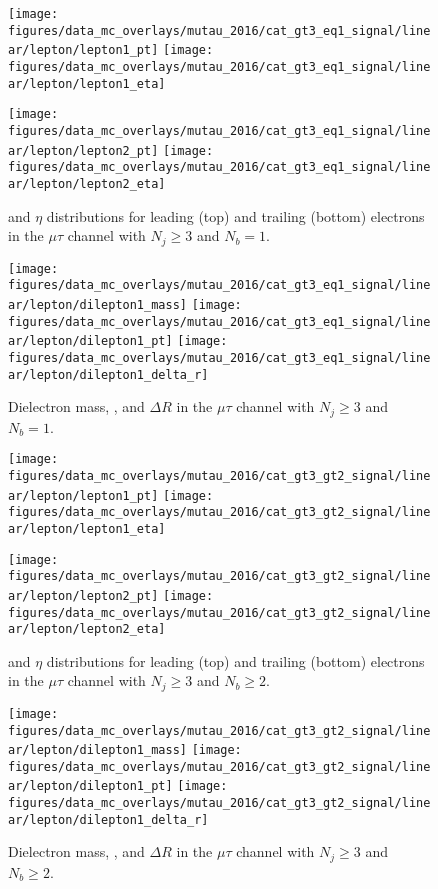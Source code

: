 \begin{figure}[htb!]
    \centering
    \texttt{[image: figures/data\_mc\_overlays/mutau\_2016/cat\_gt3\_eq1\_signal/linear/lepton/lepton1\_pt]}
    \texttt{[image: figures/data\_mc\_overlays/mutau\_2016/cat\_gt3\_eq1\_signal/linear/lepton/lepton1\_eta]}

    \texttt{[image: figures/data\_mc\_overlays/mutau\_2016/cat\_gt3\_eq1\_signal/linear/lepton/lepton2\_pt]}
    \texttt{[image: figures/data\_mc\_overlays/mutau\_2016/cat\_gt3\_eq1\_signal/linear/lepton/lepton2\_eta]}
    \caption{\pt and $\eta$ distributions for leading (top) and trailing
        (bottom) electrons in the $\mu\tau$ channel with $N_{j} \geq 3$ and
        $N_{b} = 1$.}
    \label{fig:mutau_7_kinematic}
\end{figure}

\begin{figure}[htb!]
    \centering
    \texttt{[image: figures/data\_mc\_overlays/mutau\_2016/cat\_gt3\_eq1\_signal/linear/lepton/dilepton1\_mass]}
    \texttt{[image: figures/data\_mc\_overlays/mutau\_2016/cat\_gt3\_eq1\_signal/linear/lepton/dilepton1\_pt]}
    \texttt{[image: figures/data\_mc\_overlays/mutau\_2016/cat\_gt3\_eq1\_signal/linear/lepton/dilepton1\_delta\_r]}
    \caption{Dielectron mass, \pt, and $\Delta R$ in the $\mu\tau$ channel
    with $N_{j} \geq 3$ and $N_{b} = 1$.}
    \label{fig:mutau_7_dilepton}
\end{figure}

\begin{figure}[htb!]
    \centering
    \texttt{[image: figures/data\_mc\_overlays/mutau\_2016/cat\_gt3\_gt2\_signal/linear/lepton/lepton1\_pt]}
    \texttt{[image: figures/data\_mc\_overlays/mutau\_2016/cat\_gt3\_gt2\_signal/linear/lepton/lepton1\_eta]}

    \texttt{[image: figures/data\_mc\_overlays/mutau\_2016/cat\_gt3\_gt2\_signal/linear/lepton/lepton2\_pt]}
    \texttt{[image: figures/data\_mc\_overlays/mutau\_2016/cat\_gt3\_gt2\_signal/linear/lepton/lepton2\_eta]}
    \caption{\pt and $\eta$ distributions for leading (top) and trailing
        (bottom) electrons in the $\mu\tau$ channel with $N_{j} \geq 3$ and
        $N_{b} \geq 2$.}
    \label{fig:mutau_8_kinematic}
\end{figure}

\begin{figure}[htb!]
    \centering
    \texttt{[image: figures/data\_mc\_overlays/mutau\_2016/cat\_gt3\_gt2\_signal/linear/lepton/dilepton1\_mass]}
    \texttt{[image: figures/data\_mc\_overlays/mutau\_2016/cat\_gt3\_gt2\_signal/linear/lepton/dilepton1\_pt]}
    \texttt{[image: figures/data\_mc\_overlays/mutau\_2016/cat\_gt3\_gt2\_signal/linear/lepton/dilepton1\_delta\_r]}
    \caption{Dielectron mass, \pt, and $\Delta R$ in the $\mu\tau$ channel
    with $N_{j} \geq 3$ and $N_{b} \geq 2$.}
    \label{fig:mutau_8_dilepton}
\end{figure}


